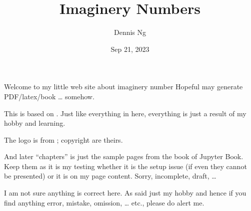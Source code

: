 \documentclass[letterpaper,10pt,english]{jupyterBook}
\title{Imaginery Numbers}
\date{Sep 21, 2023}
\author{Dennis Ng}
\begin{document}
\pagestyle{empty}
\sphinxmaketitle
\pagestyle{plain}
\sphinxtableofcontents
\pagestyle{normal}
\label{\detokenize{MacTwgssA0-intro::doc}}


\sphinxAtStartPar
Welcome to my little web site about imaginery number
Hopeful may generate PDF/latex/book … somehow.

\sphinxAtStartPar
This is based on .  Just like everything in here, everything is just a result of my hobby and learning.

\sphinxAtStartPar
The logo is from ; copyright are theirs.

\sphinxAtStartPar
And later “chapters” is just the sample pages from the book of Jupyter Book.  Keep them as it is my testing whether it is the setup issue (if even they cannot be presented) or it is on my page content.  Sorry, incomplete, draft, …

\begin{DUlineblock}{0em}
\item[] 
\end{DUlineblock}

\sphinxAtStartPar
I am not sure anything is correct here.  As said just my hobby and hence if you find anything error, mistake, omission, … etc., please do alert me.
\end{document}
